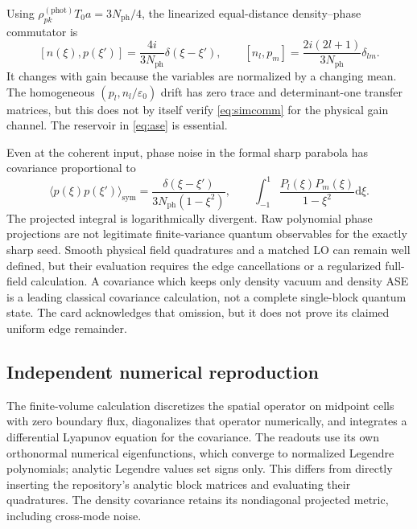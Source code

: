 \documentclass[11pt,a4paper]{article}
\newcommand{\dd}{\mathrm d}
\newcommand{\Nph}{N_{\mathrm{ph}}}
\newcommand{\eps}{\varepsilon}
\begin{document}
Using $\rho_{pk}^{(\mathrm{phot})}T_0a=3\Nph/4$, the linearized equal-distance density--phase commutator is
\begin{equation}\label{eq:simcomm}
[n(\xi),p(\xi')]=\frac{4i}{3\Nph}\delta(\xi-\xi'),\qquad
[n_l,p_m]=\frac{2i(2l+1)}{3\Nph}\delta_{lm}.
\end{equation}
It changes with gain because the variables are normalized by a changing mean. The homogeneous $(p_l,n_l/\eps_0)$ drift has zero trace and determinant-one transfer matrices, but this does not by itself verify \eqref{eq:simcomm} for the physical gain channel. The reservoir in \eqref{eq:ase} is essential.

Even at the coherent input, phase noise in the formal sharp parabola has covariance proportional to
\begin{equation}\label{eq:edge}
\langle p(\xi)p(\xi')\rangle_{\mathrm{sym}}
=\frac{\delta(\xi-\xi')}{3\Nph(1-\xi^2)},\qquad
\int_{-1}^1\frac{P_l(\xi)P_m(\xi)}{1-\xi^2}\dd\xi.
\end{equation}
The projected integral is logarithmically divergent. Raw polynomial phase projections are not legitimate finite-variance quantum observables for the exactly sharp seed. Smooth physical field quadratures and a matched LO can remain well defined, but their evaluation requires the edge cancellations or a regularized full-field calculation. A covariance which keeps only density vacuum and density ASE is a leading classical covariance calculation, not a complete single-block quantum state. The card acknowledges that omission, but it does not prove its claimed uniform edge remainder.

\subsection{Independent numerical reproduction}

The finite-volume calculation discretizes the spatial operator on midpoint cells with zero boundary flux, diagonalizes that operator numerically, and integrates a differential Lyapunov equation for the covariance. The readouts use its own orthonormal numerical eigenfunctions, which converge to normalized Legendre polynomials; analytic Legendre values set signs only. This differs from directly inserting the repository's analytic block matrices and evaluating their quadratures. The density covariance retains its nondiagonal projected metric, including cross-mode noise.
\end{document}
